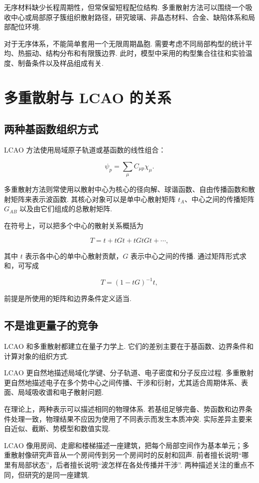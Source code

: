 \documentclass[UTF8,11pt,a4paper,openany]{ctexbook}
\begin{document}
无序材料缺少长程周期性，但常保留短程配位结构. 多重散射方法可以围绕一个吸收中心或局部原子簇组织散射路径，研究玻璃、非晶态材料、合金、缺陷体系和局部配位环境. 

对于无序体系，不能简单套用一个无限周期晶胞. 需要考虑不同局部构型的统计平均、热振动、结构分布和有限簇边界. 此时，模型中采用的构型集合往往和实验温度、制备条件以及样品组成有关. 

\section{多重散射与 LCAO 的关系}

\subsection{两种基函数组织方式}

LCAO 方法使用局域原子轨道或基函数的线性组合：

\[
\psi_p=\sum_\mu C_{\mu p}\chi_\mu.
\]

多重散射方法则常使用以散射中心为核心的径向解、球谐函数、自由传播函数和散射矩阵来表示波函数. 其核心对象可以是单中心散射矩阵 $t_A$、中心之间的传播矩阵 $G_{AB}$ 以及由它们组成的总散射矩阵. 

在符号上，可以把多个中心的散射关系概括为

\[
T
=
t+tGt+tGtGt+\cdots,
\]

其中 $t$ 表示各中心的单中心散射贡献，$G$ 表示中心之间的传播. 通过矩阵形式求和，可写成

\[
T
=
\left(1-tG\right)^{-1}t,
\]

前提是所使用的矩阵和边界条件定义适当. 

\subsection{不是谁更量子的竞争}

LCAO 和多重散射都建立在量子力学上. 它们的差别主要在于基函数、边界条件和计算对象的组织方式. 

LCAO 更自然地描述局域化学键、分子轨道、电子密度和分子反应过程. 多重散射更自然地描述电子在多个势中心之间传播、干涉和衍射，尤其适合周期体系、表面、局域吸收谱和电子散射问题. 

在理论上，两种表示可以描述相同的物理体系. 若基组足够完备、势函数和边界条件处理一致，物理结果不应因为使用了不同表示而发生本质冲突. 实际差异主要来自近似、截断、势模型和数值实现. 

\begin{analogybox}
LCAO 像用房间、走廊和楼梯描述一座建筑，把每个局部空间作为基本单元；多重散射像研究声音从一个房间传到另一个房间时的反射和回声. 前者擅长说明“哪里有局部状态”，后者擅长说明“波怎样在各处传播并干涉”. 两种描述关注的重点不同，但研究的是同一座建筑. 
\end{analogybox}
\end{document}
